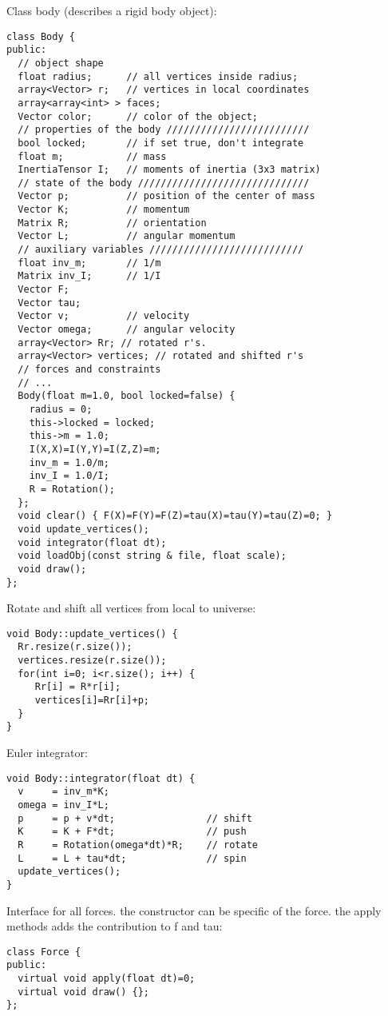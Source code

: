Class body (describes a rigid body object): \begin{lstlisting}
class Body {
public:
  // object shape
  float radius;      // all vertices inside radius;
  array<Vector> r;   // vertices in local coordinates
  array<array<int> > faces;
  Vector color;      // color of the object; 
  // properties of the body /////////////////////////
  bool locked;       // if set true, don't integrate
  float m;           // mass
  InertiaTensor I;   // moments of inertia (3x3 matrix)
  // state of the body //////////////////////////////
  Vector p;          // position of the center of mass
  Vector K;          // momentum
  Matrix R;          // orientation
  Vector L;          // angular momentum
  // auxiliary variables ///////////////////////////
  float inv_m;       // 1/m
  Matrix inv_I;      // 1/I
  Vector F;
  Vector tau;
  Vector v;          // velocity
  Vector omega;      // angular velocity
  array<Vector> Rr; // rotated r's.
  array<Vector> vertices; // rotated and shifted r's
  // forces and constraints
  // ...
  Body(float m=1.0, bool locked=false) {
    radius = 0;
    this->locked = locked;
    this->m = 1.0;
    I(X,X)=I(Y,Y)=I(Z,Z)=m;
    inv_m = 1.0/m;
    inv_I = 1.0/I;
    R = Rotation();
  };
  void clear() { F(X)=F(Y)=F(Z)=tau(X)=tau(Y)=tau(Z)=0; }
  void update_vertices();
  void integrator(float dt);
  void loadObj(const string & file, float scale);
  void draw();
};
\end{lstlisting}
\noindent
Rotate and shift all vertices from local to universe: \begin{lstlisting}
void Body::update_vertices() {
  Rr.resize(r.size());
  vertices.resize(r.size());
  for(int i=0; i<r.size(); i++) {
     Rr[i] = R*r[i];
     vertices[i]=Rr[i]+p;
  }
}
\end{lstlisting}
\noindent
Euler integrator: \begin{lstlisting}
void Body::integrator(float dt) {
  v     = inv_m*K;
  omega = inv_I*L;
  p     = p + v*dt;                // shift
  K     = K + F*dt;                // push
  R     = Rotation(omega*dt)*R;    // rotate
  L     = L + tau*dt;              // spin
  update_vertices();
}
\end{lstlisting}
\noindent
Interface for all forces.
the constructor can be specific of the force.
the apply methods adds the contribution to f and tau: \begin{lstlisting}
class Force {
public:
  virtual void apply(float dt)=0;
  virtual void draw() {};
};
\end{lstlisting}
